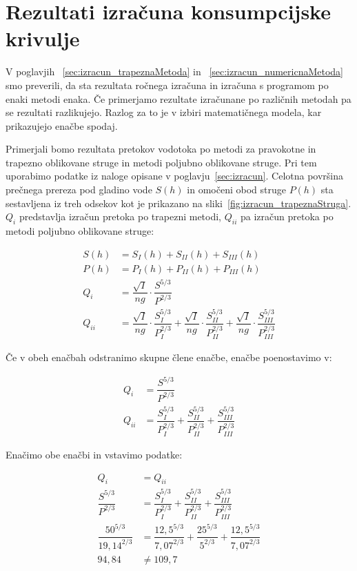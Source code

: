 \section{Rezultati izračuna konsumpcijske krivulje} \label{sec:opis_rezultatIzracuna}
V poglavjih ~\ref{sec:izracun_trapeznaMetoda} in ~\ref{sec:izracun_numericnaMetoda} smo preverili, da sta rezultata ročnega izračuna in izračuna s programom po enaki metodi enaka. Če primerjamo rezultate izračunane po različnih metodah pa se rezultati razlikujejo. Razlog za to je v izbiri matematičnega modela, kar prikazujejo enačbe spodaj.

Primerjali bomo rezultata pretokov vodotoka po metodi za pravokotne in trapezno oblikovane struge in metodi poljubno oblikovane struge. Pri tem uporabimo podatke iz naloge opisane v poglavju~\ref{sec:izracun}. Celotna površina prečnega prereza pod gladino vode $S(h)$ in omočeni obod struge $P(h)$ sta sestavljena iz treh odsekov kot je prikazano na sliki~\ref{fig:izracun_trapeznaStruga}. $Q_i$ predstavlja izračun pretoka po trapezni metodi, $Q_{ii}$ pa izračun pretoka po metodi poljubno oblikovane struge:
\begin{ceqn}
	\begin{align}
	S(h)&= S_I(h) + S_{II}(h) + S_{III}(h)\\
	P(h)&= P_I(h) + P_{II}(h) + P_{III}(h)\\
	Q_i &= \dfrac{\sqrt{I}}{ng} \cdot \dfrac{S^{5/3}}{P^{2/3}} \\
	Q_{ii} &= \dfrac{\sqrt{I}}{ng} \cdot \dfrac{S_I^{5/3}}{P_I^{2/3}} + \dfrac{\sqrt{I}}{ng} \cdot \dfrac{S_{II}^{5/3}}{P_{II}^{2/3}} + \dfrac{\sqrt{I}}{ng} \cdot \dfrac{S_{III}^{5/3}}{P_{III}^{2/3}}
	\end{align}
\end{ceqn}

Če v obeh enačbah odstranimo skupne člene enačbe, enačbe poenostavimo v:

\begin{ceqn}
	\begin{align}
	Q_i &=\dfrac{S^{5/3}}{P^{2/3}}\\
	Q_{ii} &= \dfrac{S_I^{5/3}}{P_I^{2/3}} + \dfrac{S_{II}^{5/3}}{P_{II}^{2/3}} + \dfrac{S_{III}^{5/3}}{P_{III}^{2/3}}
	\end{align}
\end{ceqn}


Enačimo obe enačbi in vstavimo podatke:
\begin{ceqn}
	\begin{align}
	Q_i &= Q_{ii}\\
	\dfrac{S^{5/3}}{P^{2/3}} &= \dfrac{S_I^{5/3}}{P_I^{2/3}} + \dfrac{S_{II}^{5/3}}{P_{II}^{2/3}} + \dfrac{S_{III}^{5/3}}{P_{III}^{2/3}}\\
	\dfrac{50^{5/3}}{19,14^{2/3}} &= \dfrac{12,5^{5/3}}{7,07^{2/3}} + \dfrac{25^{5/3}}{5^{2/3}} + \dfrac{12,5^{5/3}}{7,07^{2/3}}\\
	94,84 &\neq 109,7
	\end{align}
\end{ceqn}


